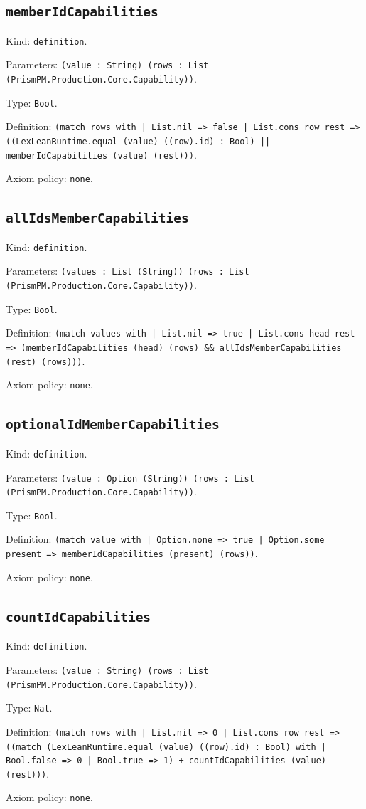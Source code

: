 \documentclass[11pt]{article}
\begin{document}
\subsection*{\texttt{memberIdCapabilities}}
\noindent Kind: \texttt{definition}.\par
\noindent Parameters: \texttt{(value : String) (rows : List (PrismPM.Production.Core.Capability))}.\par
\noindent Type: \texttt{Bool}.\par
\noindent Definition: \texttt{(match rows with | List.nil => false | List.cons row rest => ((LexLeanRuntime.equal (value) ((row).id) : Bool) || memberIdCapabilities (value) (rest)))}.\par
\noindent Axiom policy: \texttt{none}.\par
\subsection*{\texttt{allIdsMemberCapabilities}}
\noindent Kind: \texttt{definition}.\par
\noindent Parameters: \texttt{(values : List (String)) (rows : List (PrismPM.Production.Core.Capability))}.\par
\noindent Type: \texttt{Bool}.\par
\noindent Definition: \texttt{(match values with | List.nil => true | List.cons head rest => (memberIdCapabilities (head) (rows) \&\& allIdsMemberCapabilities (rest) (rows)))}.\par
\noindent Axiom policy: \texttt{none}.\par
\subsection*{\texttt{optionalIdMemberCapabilities}}
\noindent Kind: \texttt{definition}.\par
\noindent Parameters: \texttt{(value : Option (String)) (rows : List (PrismPM.Production.Core.Capability))}.\par
\noindent Type: \texttt{Bool}.\par
\noindent Definition: \texttt{(match value with | Option.none => true | Option.some present => memberIdCapabilities (present) (rows))}.\par
\noindent Axiom policy: \texttt{none}.\par
\subsection*{\texttt{countIdCapabilities}}
\noindent Kind: \texttt{definition}.\par
\noindent Parameters: \texttt{(value : String) (rows : List (PrismPM.Production.Core.Capability))}.\par
\noindent Type: \texttt{Nat}.\par
\noindent Definition: \texttt{(match rows with | List.nil => 0 | List.cons row rest => ((match (LexLeanRuntime.equal (value) ((row).id) : Bool) with | Bool.false => 0 | Bool.true => 1) + countIdCapabilities (value) (rest)))}.\par
\noindent Axiom policy: \texttt{none}.\par
\end{document}
